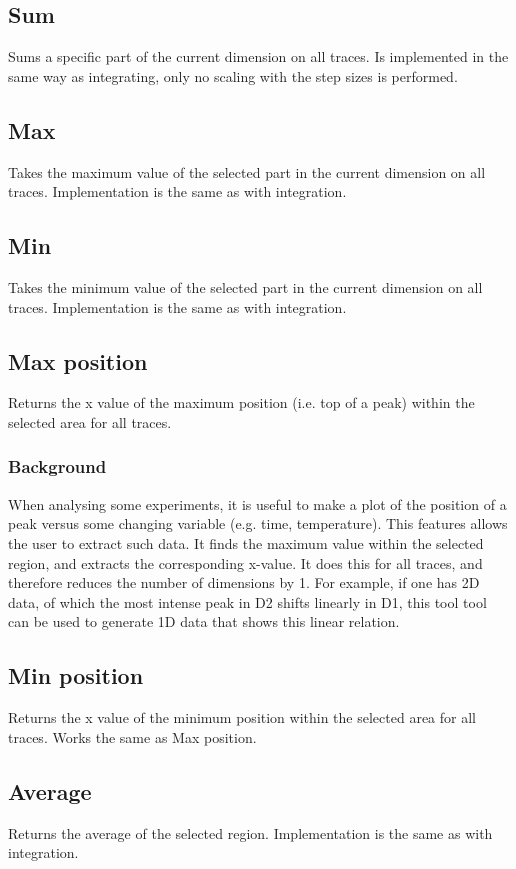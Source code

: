 \documentclass[11pt,a4paper]{article}
\begin{document}
\subsection{Sum}
Sums a specific part of the current dimension on all traces. Is implemented in the same way as integrating, only no scaling with the step sizes is performed.

\subsection{Max}
Takes the maximum value of the selected part in the current dimension on all traces. Implementation is the same as with integration.

\subsection{Min}
Takes the minimum value of the selected part in the current dimension on all traces. Implementation is the same as with integration.

\subsection{Max position}
Returns the x value of the maximum position (i.e. top of a peak) within the selected area for all traces.

\subsubsection*{Background}
When analysing some experiments, it is useful to make a plot of the position of a peak versus some changing variable (e.g. time, temperature). This features allows the user to extract such data. It finds the maximum value within the selected region, and extracts the corresponding x-value. It does this for all traces, and therefore reduces the number of dimensions by 1. For example, if one has 2D data, of which the most intense peak in D2 shifts linearly in D1, this tool tool can be used to generate 1D data that shows this linear relation.

\subsection{Min position}
Returns the x value of the minimum position within the selected area for all traces. Works the same as Max position.

\subsection{Average}
Returns the average of the selected region. Implementation is the same as with integration.
\end{document}
